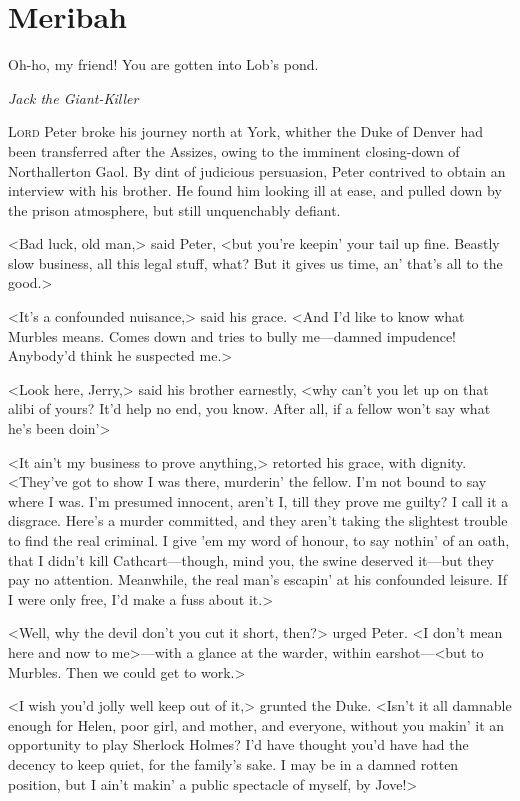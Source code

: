 
\chapter{Meribah}

\epigraph{Oh-ho, my friend! You are gotten into Lob's pond.}{\textit{Jack the Giant-Killer}}

\lettrine{L}{ord} Peter broke his journey north at York, whither the Duke of Denver had been transferred after the Assizes, owing to the imminent closing-down of Northallerton Gaol. By dint of judicious persuasion, Peter contrived to obtain an interview with his brother. He found him looking ill at ease, and pulled down by the prison atmosphere, but still unquenchably defiant.

<Bad luck, old man,> said Peter, <but you're keepin' your tail up fine. Beastly slow business, all this legal stuff, what? But it gives us time, an' that's all to the good.>

<It's a confounded nuisance,> said his grace. <And I'd like to know what Murbles means. Comes down and tries to bully me—damned impudence! Anybody'd think he suspected me.>

<Look here, Jerry,> said his brother earnestly, <why can't you let up on that alibi of yours? It'd help no end, you know. After all, if a fellow won't say what he's been doin'\longdash>

<It ain't my business to prove anything,> retorted his grace, with dignity. <They've got to show I was there, murderin' the fellow. I'm not bound to say where I was. I'm presumed innocent, aren't I, till they prove me guilty? I call it a disgrace. Here's a murder committed, and they aren't taking the slightest trouble to find the real criminal. I give 'em my word of honour, to say nothin' of an oath, that I didn't kill Cathcart—though, mind you, the swine deserved it—but they pay no attention. Meanwhile, the real man's escapin' at his confounded leisure. If I were only free, I'd make a fuss about it.>

<Well, why the devil don't you cut it short, then?> urged Peter. <I don't mean here and now to me>—with a glance at the warder, within earshot—<but to Murbles. Then we could get to work.>

<I wish you'd jolly well keep out of it,> grunted the Duke. <Isn't it all damnable enough for Helen, poor girl, and mother, and everyone, without you makin' it an opportunity to play Sherlock Holmes? I'd have thought you'd have had the decency to keep quiet, for the family's sake. I may be in a damned rotten position, but I ain't makin' a public spectacle of myself, by Jove!>

